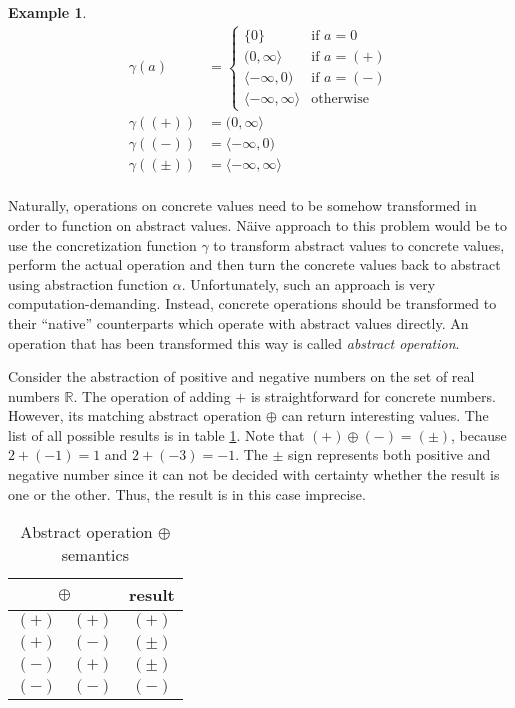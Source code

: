 \documentclass[12pt,final,oneside]{fithesis2}
\theoremstyle{definition}
\newtheorem{example}{Example}[chapter]
\begin{document}
\begin{example}
\label{ex:concretizationfunc}
\begin{align*}
\gamma(a) &=
\begin{cases}
\{ 0 \} & \text{if } a = 0 \\
(0, \infty \rangle & \text{if } a = (+) \\
\langle -\infty, 0) & \text{if } a = (-) \\
\langle -\infty, \infty \rangle & \text{otherwise}
\end{cases} \\
\gamma((+)) &= (0, \infty \rangle \\
\gamma((-)) &= \langle -\infty, 0) \\
\gamma((\pm)) &= \langle -\infty, \infty \rangle \\
\end{align*}
\end{example}

Naturally, operations on concrete values need to be somehow transformed
in order to function on abstract values. N\"{a}ive approach to this problem
would be to use the concretization function $\gamma$ to transform abstract
values to concrete values, perform the actual operation and then turn the
concrete values back to abstract using abstraction function $\alpha$.
Unfortunately, such an approach is very computation-demanding. Instead,
concrete operations should be transformed to their ``native'' counterparts
which operate with abstract values directly. An operation that has been
transformed this way is called \textit{abstract operation}.

Consider the abstraction of positive and negative numbers on the set of real
numbers $\mathbb{R}$. The operation of adding $+$ is straightforward for
concrete numbers. However, its matching abstract operation $\oplus$ can
return interesting values. The list of all possible results is in
table \ref{tab:abstractplus}. Note that $(+) \oplus (-) = (\pm)$, because
$2 + (-1) = 1$ and $2 + (-3) = -1$. The $\pm$ sign represents both
positive and negative number since it can not be decided with certainty
whether the result is one or the other. Thus, the result is in this case
imprecise.

\begin{table}[ht]
\centering
\begin{tabular}{c|c|c}
\multicolumn{2}{c|}{$\oplus$} & result \\
\hline
$(+)$ & $(+)$ & $(+)$ \\
$(+)$ & $(-)$ & $(\pm)$ \\
$(-)$ & $(+)$ & $(\pm)$ \\
$(-)$ & $(-)$ & $(-)$ \\
\end{tabular}
\caption{Abstract operation $\oplus$ semantics}
\label{tab:abstractplus}
\end{table}
\end{document}
